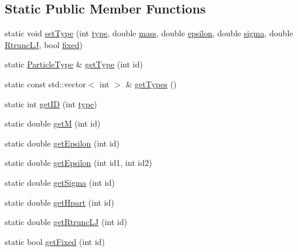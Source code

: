 \subsection*{Static Public Member Functions}
\begin{DoxyCompactItemize}
\item 
static void \hyperlink{classParticleType_a16790588fbd9fce239cf92dedc8753c6}{set\+Type} (int \hyperlink{classtype}{type}, double \hyperlink{classParticleType_a50e29ce810f7695975cd1783fc39d123}{mass}, double \hyperlink{classParticleType_a7f7401600e63f6445ebc74ca001d7e2f}{epsilon}, double \hyperlink{classParticleType_a25ee646610c406b46d8eb12b40c22702}{sigma}, double \hyperlink{classParticleType_a5bcb4a735490f24a0c764e7a866ef39f}{Rtrunc\+LJ}, bool \hyperlink{classParticleType_acfda1ab133ca64961b06074acff72897}{fixed})
\item 
static \hyperlink{classParticleType}{Particle\+Type} \& \hyperlink{classParticleType_a533f940ccc0e444d7c6c7f4bf2f216df}{get\+Type} (int id)
\item 
static const std\+::vector$<$ int $>$ \& \hyperlink{classParticleType_aadb6e085226e21dfca07e9acd0142120}{get\+Types} ()
\item 
static int \hyperlink{classParticleType_a87220ce5f8cbc3fd8d0fab80510584ce}{get\+ID} (int \hyperlink{classtype}{type})
\item 
static double \hyperlink{classParticleType_a08e9f955b43b74e9cef4c3a3e016cc25}{getM} (int id)
\item 
static double \hyperlink{classParticleType_a7cacf1cc54b021f8175dce0f88e043dd}{get\+Epsilon} (int id)
\item 
static double \hyperlink{classParticleType_a4a83d72ce034ce1c9519f82d6f923567}{get\+Epsilon} (int id1, int id2)
\item 
static double \hyperlink{classParticleType_a6abea61496e9d4a405232a776bcf55cf}{get\+Sigma} (int id)
\item 
static double \hyperlink{classParticleType_a12a406fdca0c084d77e00d3696ab7194}{get\+Hpart} (int id)
\item 
static double \hyperlink{classParticleType_a9195d845ba4de870e25a57d91945b9c1}{get\+Rtrunc\+LJ} (int id)
\item 
static bool \hyperlink{classParticleType_a339d07a38ee1069579428bbc71c420bb}{get\+Fixed} (int id)
\end{DoxyCompactItemize}
